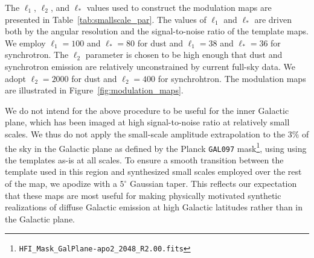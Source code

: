 \documentclass[twocolumn]{aastex631}
\newcommand{\giuse}[1]{\textcolor{orange}{(GP: #1)}}
\begin{document}
The $\ell_1$, $\ell_2$, and $\ell_*$ values used to construct the modulation maps are presented in Table~\ref{tab:smallscale_par}. The values of $\ell_1$ and $\ell_*$ are driven both by the angular resolution and the signal-to-noise ratio of the template maps. We employ $\ell_1=100$ and $\ell_*=80$ for dust and $\ell_1=38$ and $\ell_*=36$ for synchrotron. The $\ell_2$ parameter is chosen to be high enough that dust and synchrotron emission are relatively unconstrained by current full-sky data. We adopt  $\ell_2=2000$ for dust and $\ell_2 = 400$ for synchrohtron. The modulation maps are illustrated in Figure~\ref{fig:modulation_maps}.




We do not intend for the above procedure to be useful for the inner Galactic plane, which has been imaged at high signal-to-noise ratio at relatively small scales. We thus do not apply the small-scale amplitude extrapolation to the $3\%$ of the sky in the Galactic plane as defined by the Planck \texttt{GAL097} mask\footnote{\texttt{HFI\_Mask\_GalPlane-apo2\_2048\_R2.00.fits}}, using using the templates as-is at all scales. To ensure a smooth transition between the template used in this region and synthesized small scales employed over the rest of the map, we apodize with a $5^\circ$ Gaussian taper. This reflects our expectation that these maps are most useful for making physically motivated synthetic realizations of diffuse Galactic emission at high Galactic latitudes rather than in the Galactic plane. 

\end{document}
